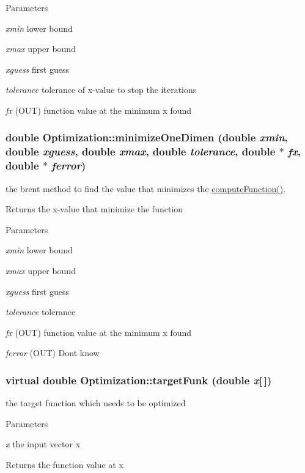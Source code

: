 \begin{DoxyParams}{Parameters}
\item[{\em xmin}]lower bound \item[{\em xmax}]upper bound \item[{\em xguess}]first guess \item[{\em tolerance}]tolerance of x-\/value to stop the iterations \item[{\em fx}](OUT) function value at the minimum x found \end{DoxyParams}
\hypertarget{classOptimization_a59ccdfae81744716ce48226da029d470}{
\subsubsection[{minimizeOneDimen}]{\setlength{\rightskip}{0pt plus 5cm}double Optimization::minimizeOneDimen (double {\em xmin}, \/  double {\em xguess}, \/  double {\em xmax}, \/  double {\em tolerance}, \/  double $\ast$ {\em fx}, \/  double $\ast$ {\em ferror})}}
\label{classOptimization_a59ccdfae81744716ce48226da029d470}
the brent method to find the value that minimizes the \hyperlink{classOptimization_ad7ca7b884076f8c76312d516e23c6609}{computeFunction()}. \begin{DoxyReturn}{Returns}
the x-\/value that minimize the function 
\end{DoxyReturn}

\begin{DoxyParams}{Parameters}
\item[{\em xmin}]lower bound \item[{\em xmax}]upper bound \item[{\em xguess}]first guess \item[{\em tolerance}]tolerance \item[{\em fx}](OUT) function value at the minimum x found \item[{\em ferror}](OUT) Dont know \end{DoxyParams}
\hypertarget{classOptimization_a7fe7c6178977ef7840ff65d216bf590e}{
\subsubsection[{targetFunk}]{\setlength{\rightskip}{0pt plus 5cm}virtual double Optimization::targetFunk (double {\em x}\mbox{[}$\,$\mbox{]})}}
\label{classOptimization_a7fe7c6178977ef7840ff65d216bf590e}
the target function which needs to be optimized 
\begin{DoxyParams}{Parameters}
\item[{\em x}]the input vector x \end{DoxyParams}
\begin{DoxyReturn}{Returns}
the function value at x 
\end{DoxyReturn}


